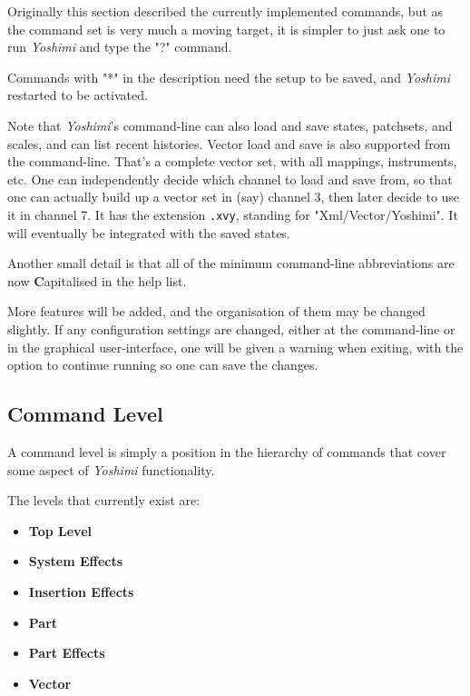    Originally this section described the currently implemented commands,
   but as the command set is very much a moving target, it is simpler to just
   ask one to run \textsl{Yoshimi} and type the "?" command.

   Commands with "*" in the description need the setup to be saved,
   and \textsl{Yoshimi} restarted to be activated. 

   Note that \textsl{Yoshimi}'s command-line can also load and save states,
   patchsets, and scales, and can list recent histories.
   Vector load and save is also supported from the command-line.
   That's a complete vector set, with all mappings, instruments, etc.
   One can independently decide which
   channel to load and save from, so that one
   can actually build up a vector set in
   (say) channel 3, then later decide to use it in channel 7.
   It has the extension \texttt{.xvy}, standing for "Xml/Vector/Yoshimi".
   It will eventually be integrated with the saved states.

   Another small detail is that all of the minimum command-line
   abbreviations are now \textbf{C}apitalised in the help list.     

   More features will be added, and the organisation of them may be changed
   slightly.  If any configuration settings are changed, either at the
   command-line or in the graphical user-interface, one will be given a warning
   when exiting, with the option to continue running so one can save the
   changes.

\subsection{Command Level}
\label{subsec:command_line_command_level}

   A command level is simply a position in the hierarchy of commands that cover
   some aspect of \textsl{Yoshimi} functionality.

   The levels that currently exist are:

   \begin{itemize}
      \item \textbf{Top Level}
      \item \textbf{System Effects}
      \item \textbf{Insertion Effects}
      \item \textbf{Part}
      \item \textbf{Part Effects}
      \item \textbf{Vector}
   \end{itemize}

